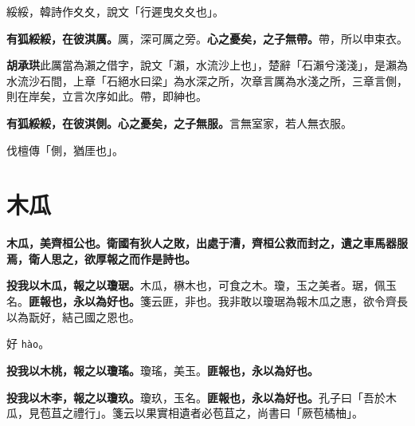 \begin{quoting}綏綏，韓詩作夊夊，說文「行遲曳夊夊也」。\end{quoting}

\textbf{有狐綏綏，在彼淇厲。}{\footnotesize 厲，深可厲之旁。}\textbf{心之憂矣，之子無帶。}{\footnotesize 帶，所以申束衣。}

\begin{quoting}\textbf{胡承珙}此厲當為瀨之借字，說文「瀨，水流沙上也」，楚辭「石瀨兮淺淺」，是瀨為水流沙石間，上章「石絕水曰梁」為水深之所，次章言厲為水淺之所，三章言側，則在岸矣，立言次序如此。帶，即紳也。\end{quoting}

\textbf{有狐綏綏，在彼淇側。心之憂矣，之子無服。}{\footnotesize 言無室家，若人無衣服。}

\begin{quoting}伐檀傳「側，猶厓也」。\end{quoting}

\section{木瓜}


\textbf{木瓜，美齊桓公也。衛國有狄人之敗，出處于漕，齊桓公救而封之，遺之車馬器服焉，衛人思之，欲厚報之而作是詩也。}

\textbf{投我以木瓜，報之以瓊琚。}{\footnotesize 木瓜，楙木也，可食之木。瓊，玉之美者。琚，佩玉名。}\textbf{匪報也，永以為好也。}{\footnotesize 箋云匪，非也。我非敢以瓊琚為報木瓜之惠，欲令齊長以為翫好，結己國之恩也。}

\begin{quoting}好 \texttt{hào}。\end{quoting}

\textbf{投我以木桃，報之以瓊瑤。}{\footnotesize 瓊瑤，美玉。}\textbf{匪報也，永以為好也。}

\textbf{投我以木李，報之以瓊玖。}{\footnotesize 瓊玖，玉名。}\textbf{匪報也，永以為好也。}{\footnotesize 孔子曰「吾於木瓜，見苞苴之禮行」。箋云以果實相遺者必苞苴之，尚書曰「厥苞橘柚」。}

